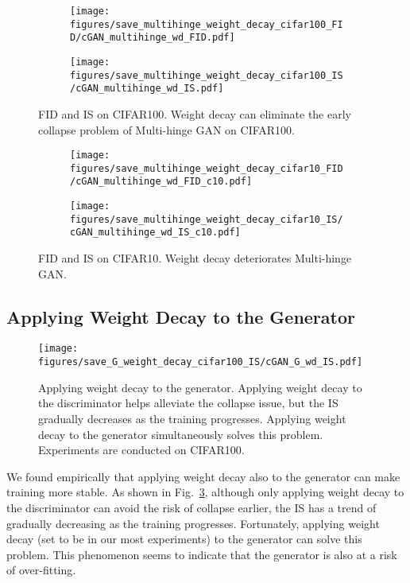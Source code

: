 \documentclass[paper_2425.tex]{subfiles}
\begin{document}
\begin{figure}[t]
  \centering
  \begin{subfigure}{0.49\linewidth}
\texttt{[image: figures/save\_multihinge\_weight\_decay\_cifar100\_FID/cGAN\_multihinge\_wd\_FID.pdf]}
    \caption{}
  \end{subfigure}
  \begin{subfigure}{0.49\linewidth}
    \centering
    \texttt{[image: figures/save\_multihinge\_weight\_decay\_cifar100\_IS/cGAN\_multihinge\_wd\_IS.pdf]}
    \caption{}
  \end{subfigure}
  \caption{FID and IS on CIFAR100. Weight decay can eliminate the early collapse problem of Multi-hinge GAN on CIFAR100.}
  \label{apx:fig:multihinge_wd_c100}
\end{figure}

\begin{figure}[t]
  \begin{subfigure}{0.49\linewidth}
    \centering
\texttt{[image: figures/save\_multihinge\_weight\_decay\_cifar10\_FID/cGAN\_multihinge\_wd\_FID\_c10.pdf]}
\caption{}
\end{subfigure}
  \begin{subfigure}{0.49\linewidth}
    \centering
\texttt{[image: figures/save\_multihinge\_weight\_decay\_cifar10\_IS/cGAN\_multihinge\_wd\_IS\_c10.pdf]}
\caption{}
\end{subfigure}
  \caption{FID and IS on CIFAR10. Weight decay deteriorates Multi-hinge GAN.}
  \label{apx:fig:multihinge_wd_c10}
\end{figure}

\subsection{Applying Weight Decay to the Generator}
\label{apx:sec:weight_decay_generator}

\begin{figure}[t]
  \centering
  \centering
  \texttt{[image: figures/save\_G\_weight\_decay\_cifar100\_IS/cGAN\_G\_wd\_IS.pdf]}
  \caption{Applying weight decay to the generator. Applying weight decay to the discriminator helps alleviate the collapse issue, but the IS gradually decreases as the training progresses. Applying weight decay to the generator simultaneously solves this problem. Experiments are conducted on CIFAR100.}
  \label{apx:fig:generator_wd}
\end{figure}


We found empirically that applying weight decay also to the generator can make training more stable. As shown in Fig.~\ref{apx:fig:generator_wd}, although only applying weight decay to the discriminator can avoid the risk of collapse earlier, the IS has a trend of gradually decreasing as the training progresses. Fortunately, applying weight decay (set to be  in our most experiments) to the generator can solve this problem. This phenomenon seems to indicate that the generator is also at a risk of over-fitting.
\end{document}
